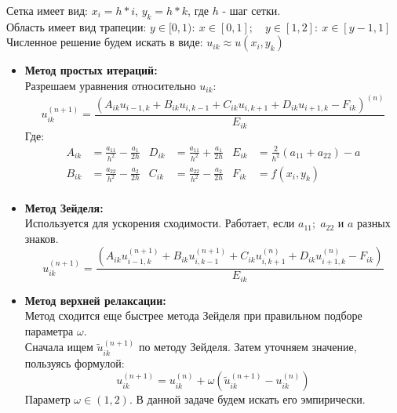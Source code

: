 \documentclass[a4paper,12pt]{report}
\begin{document}
Сетка имеет вид: $x_i = h * i$, $y_k = h * k$, где $h$ - шаг сетки. 
\\Область имеет вид трапеции: $y\in[0,1): \: x\in[0,1]; \quad y\in[1,2]: \: x\in[y-1,1]$
\\Численное решение будем искать в виде: $u_{ik} \approx u(x_i, y_k)$
\\
\begin{itemize}
\item{{\bf Метод простых итераций:}\\
Разрешаем уравнения относительно $u_{ik}$:
\begin{equation}
u_{ik}^{(n+1)}=\frac{ \left( A_{ik}u_{i-1,k} + B_{ik}u_{i,k-1} + C_{ik}u_{i,k+1} + D_{ik}u_{i+1,k} - F_{ik} \right)^{(n)} }{E_{ik}}
\end{equation}
Где:
\begin{equation}
\begin{aligned}
A_{ik} & = \frac{a_{11}}{h^2} - \frac{a_1}{2h} & D_{ik} & = \frac{a_{11}}{h^2} + \frac{a_1}{2h} & E_{ik} & = \frac{2}{h^2}(a_{11}+a_{22}) - a \\
B_{ik} & = \frac{a_{22}}{h^2} - \frac{a_2}{2h} & C_{ik} & = \frac{a_{22}}{h^2} - \frac{a_2}{2h} & F_{ik} & = f(x_i,y_k) \\
\end{aligned}
\end{equation}
}
\item{{\bf Метод Зейделя:}
\\ Используется для ускорения сходимости. Работает, если $a_{11}; \; a_{22}$ и $a$ разных знаков.
\begin{equation}
u_{ik}^{(n+1)}=\frac{ \left( A_{ik}u_{i-1,k}^{(n+1)} + B_{ik}u_{i,k-1}^{(n+1)} + C_{ik}u_{i,k+1}^{(n)} + D_{ik}u_{i+1,k}^{(n)} - F_{ik} \right) }{E_{ik}}
\end{equation}
}
\item{{\bf Метод верхней релаксации:}
\\ Метод сходится еще быстрее метода Зейделя при правильном подборе параметра $\omega$.
\\ Сначала ищем $ \tilde{u}_{ik}^{(n+1)} $ по методу Зейделя. Затем уточняем значение, пользуясь формулой:
\begin{equation}
u_{ik}^{(n+1)} = u_{ik}^{(n)} + \omega(\tilde{u}_{ik}^{(n+1)} - u_{ik}^{(n)})
\end{equation}
Параметр $\omega \in (1,2)$. В данной задаче будем искать его эмпирически.
}
\end{itemize}
\end{document}
